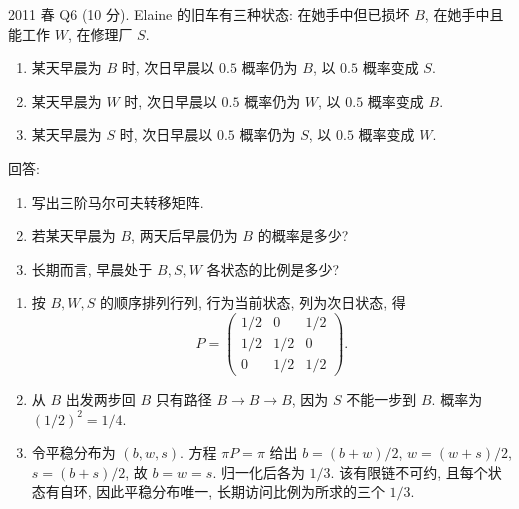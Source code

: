 \begin{exercise}\label{ex:fe2011q6}
2011 春 Q6 (10 分). Elaine 的旧车有三种状态: 在她手中但已损坏 $B$, 在她手中且能工作 $W$, 在修理厂 $S$.
\begin{enumerate}[label=(\roman*)]
\item 某天早晨为 $B$ 时, 次日早晨以 $0.5$ 概率仍为 $B$, 以 $0.5$ 概率变成 $S$.
\item 某天早晨为 $W$ 时, 次日早晨以 $0.5$ 概率仍为 $W$, 以 $0.5$ 概率变成 $B$.
\item 某天早晨为 $S$ 时, 次日早晨以 $0.5$ 概率仍为 $S$, 以 $0.5$ 概率变成 $W$.
\end{enumerate}
回答:
\begin{enumerate}[label=(\alph*)]
\item\label{ex:fe2011q6-a} 写出三阶马尔可夫转移矩阵.
\item\label{ex:fe2011q6-b} 若某天早晨为 $B$, 两天后早晨仍为 $B$ 的概率是多少?
\item\label{ex:fe2011q6-c} 长期而言, 早晨处于 $B,S,W$ 各状态的比例是多少?
\end{enumerate}
\end{exercise}
\begin{solution}
\begin{enumerate}[label=(\alph*)]
\item\label{sol:fe2011q6-a} 按 $B,W,S$ 的顺序排列行列, 行为当前状态, 列为次日状态, 得
\[
 P=\begin{pmatrix}1/2&0&1/2\\1/2&1/2&0\\0&1/2&1/2\end{pmatrix}.
\]
\item\label{sol:fe2011q6-b} 从 $B$ 出发两步回 $B$ 只有路径 $B\to B\to B$, 因为 $S$ 不能一步到 $B$. 概率为 $(1/2)^2=1/4$.
\item\label{sol:fe2011q6-c} 令平稳分布为 $(b,w,s)$. 方程 $\pi P=\pi$ 给出 $b=(b+w)/2$, $w=(w+s)/2$, $s=(b+s)/2$, 故 $b=w=s$. 归一化后各为 $1/3$. 该有限链不可约, 且每个状态有自环, 因此平稳分布唯一, 长期访问比例为所求的三个 $1/3$.
\end{enumerate}
\end{solution}

